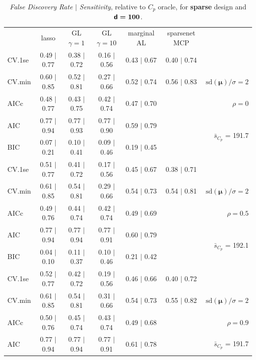\documentclass[12pt]{article}
\newcommand{\mr}[1]{\mathrm{#1}}
\newcommand{\bm}[1]{\mathbf{#1}}
\begin{document}
\begin{table}[p]\vspace{-.5cm}
\caption[l]{ {\it False Discovery Rate $\mid$ Sensitivity}, 
relative to $C_p$ oracle, for {\bf sparse} design and $\boldsymbol{{\sf d}=100}$.}
\vspace{-.5cm}
\small{}
\begin{center}
\begin{tabular}{l*{5}{c}|r}
 & lasso & GL $\gamma=1$ & GL $\gamma=10$ & marginal AL & sparsenet MCP  & \\
 \cline{1-7}
CV.1se & 0.49 $\mid$ 0.77 & 0.38 $\mid$ 0.72 & 0.16 $\mid$ 0.56 & 0.43 $\mid$ 0.67 & 0.40 $\mid$ 0.74 &\\
CV.min & 0.60 $\mid$ 0.85 & 0.52 $\mid$ 0.81 & 0.27 $\mid$ 0.66 & 0.52 $\mid$ 0.74 & 0.56 $\mid$ 0.83 &  $\mr{sd}(\bm{\mu})/\sigma=2$ \\
AICc & 0.48 $\mid$ 0.77 & 0.43 $\mid$ 0.75 & 0.42 $\mid$ 0.74 & 0.47 $\mid$ 0.70 & & $\rho=0$ \\
AIC & 0.77 $\mid$ 0.94 & 0.77 $\mid$ 0.93 & 0.77 $\mid$ 0.90 & 0.59 $\mid$ 0.79 & & \multirow{2}{*}{$\bar{s}_{C_p}$ = 191.7} \\
BIC & 0.07 $\mid$ 0.21 & 0.10 $\mid$ 0.41 & 0.09 $\mid$ 0.46 & 0.19 $\mid$ 0.45 & & \\
 \hline 
CV.1se & 0.51 $\mid$ 0.77 & 0.41 $\mid$ 0.72 & 0.17 $\mid$ 0.56 & 0.45 $\mid$ 0.67 & 0.38 $\mid$ 0.71 &\\
CV.min & 0.61 $\mid$ 0.85 & 0.54 $\mid$ 0.81 & 0.29 $\mid$ 0.66 & 0.54 $\mid$ 0.73 & 0.54 $\mid$ 0.81 &  $\mr{sd}(\bm{\mu})/\sigma=2$ \\
AICc & 0.49 $\mid$ 0.76 & 0.44 $\mid$ 0.74 & 0.42 $\mid$ 0.74 & 0.49 $\mid$ 0.69 & & $\rho=0.5$ \\
AIC & 0.77 $\mid$ 0.94 & 0.77 $\mid$ 0.94 & 0.77 $\mid$ 0.91 & 0.60 $\mid$ 0.79 & & \multirow{2}{*}{$\bar{s}_{C_p}$ = 192.1} \\
BIC & 0.04 $\mid$ 0.10 & 0.11 $\mid$ 0.37 & 0.10 $\mid$ 0.46 & 0.21 $\mid$ 0.42 & & \\
 \hline 
CV.1se & 0.52 $\mid$ 0.77 & 0.42 $\mid$ 0.72 & 0.19 $\mid$ 0.56 & 0.46 $\mid$ 0.66 & 0.40 $\mid$ 0.72 &\\
CV.min & 0.61 $\mid$ 0.85 & 0.54 $\mid$ 0.81 & 0.31 $\mid$ 0.66 & 0.54 $\mid$ 0.73 & 0.55 $\mid$ 0.82 &  $\mr{sd}(\bm{\mu})/\sigma=2$ \\
AICc & 0.50 $\mid$ 0.76 & 0.45 $\mid$ 0.74 & 0.43 $\mid$ 0.74 & 0.49 $\mid$ 0.68 & & $\rho=0.9$ \\
AIC & 0.77 $\mid$ 0.94 & 0.77 $\mid$ 0.94 & 0.77 $\mid$ 0.91 & 0.61 $\mid$ 0.78 & & \multirow{2}{*}{$\bar{s}_{C_p}$ = 191.7} \\

\end{tabular}
\end{center}
\end{table}
\end{document}
